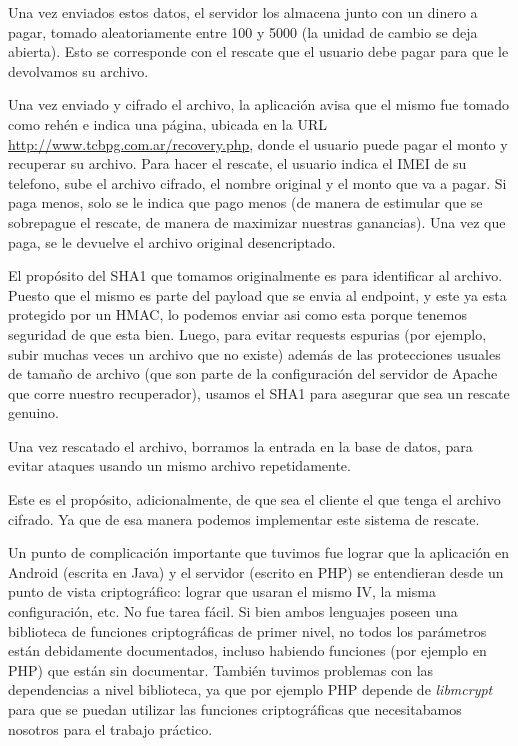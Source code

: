 Una vez enviados estos datos, el servidor los almacena junto con un dinero a pagar, tomado aleatoriamente entre 100 y 5000 (la unidad de cambio
se deja abierta). Esto se corresponde con el rescate que el usuario debe pagar para que le devolvamos su archivo.

Una vez enviado y cifrado el archivo, la aplicación avisa que el mismo fue tomado como rehén e indica una página, ubicada en la URL
\url{http://www.tcbpg.com.ar/recovery.php}, donde el usuario puede pagar el monto y recuperar su archivo. Para hacer el rescate, el usuario
indica el IMEI de su telefono, sube el archivo cifrado, el nombre original y el monto que va a pagar. Si paga menos, solo se le indica que pago
menos (de manera de estimular que se sobrepague el rescate, de manera de maximizar nuestras ganancias). Una vez que paga, se le devuelve el
archivo original desencriptado.

El propósito del SHA1 que tomamos originalmente es para identificar al archivo. Puesto que el mismo es parte del payload que se envia al
endpoint, y este ya esta protegido por un HMAC, lo podemos enviar asi como esta porque tenemos seguridad de que esta bien. Luego, para evitar
requests espurias (por ejemplo, subir muchas veces un archivo que no existe) además de las protecciones usuales de tamaño de archivo (que son
parte de la configuración del servidor de Apache que corre nuestro recuperador), usamos el SHA1 para asegurar que sea un rescate genuino.

Una vez rescatado el archivo, borramos la entrada en la base de datos, para evitar ataques usando un mismo archivo repetidamente.

Este es el propósito, adicionalmente, de que sea el cliente el que tenga el archivo cifrado. Ya que de esa manera podemos implementar este
sistema de rescate.

Un punto de complicación importante que tuvimos fue lograr que la aplicación en Android (escrita en Java) y el servidor (escrito en PHP) se
entendieran desde un punto de vista criptográfico: lograr que usaran el mismo IV, la misma configuración, etc. No fue tarea fácil. Si bien
ambos lenguajes poseen una biblioteca de funciones criptográficas de primer nivel, no todos los parámetros están debidamente documentados,
incluso habiendo funciones (por ejemplo en PHP) que están sin documentar. También tuvimos problemas con las dependencias a nivel biblioteca,
ya que por ejemplo PHP depende de \textit{libmcrypt} para que se puedan utilizar las funciones criptográficas que necesitabamos nosotros para
el trabajo práctico.

